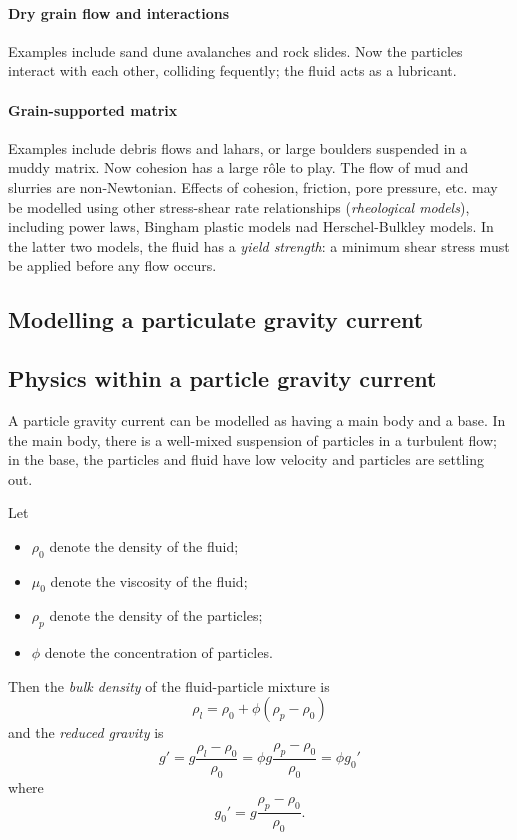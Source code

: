 \paragraph{Dry grain flow and interactions} Examples include sand dune
avalanches and rock slides. Now the particles interact with each other,
colliding fequently; the fluid acts as a lubricant. 

\paragraph{Grain-supported matrix} Examples include debris flows and lahars, or
large boulders suspended in a muddy matrix. Now cohesion has a large r\^ole to
play. The flow of mud and slurries are non-Newtonian. Effects of cohesion,
friction, pore pressure, etc. may be modelled using other stress-shear rate
relationships (\textit{rheological models}), including power laws, Bingham
plastic models nad Herschel-Bulkley models. In the latter two models, the fluid
has a \textit{yield strength}: a minimum shear stress must be applied before any
flow occurs. 

\subsection{Modelling a particulate gravity current}



\subsection{Physics within a particle gravity current}

A particle gravity current can be modelled as having a main body and a base. In
the main body, there is a well-mixed suspension of particles in a turbulent
flow; in the base, the particles and fluid have low velocity and particles are
settling out. 

Let
\begin{itemize}
 \item $\rho_0$ denote the density of the fluid;
 \item $\mu_0$ denote the viscosity of the fluid;
 \item $\rho_p$ denote the density of the particles;
 \item $\phi$ denote the concentration of particles.
\end{itemize}
Then the \textit{bulk density} of the fluid-particle mixture is
\begin{equation}
    \rho_l = \rho_0 + \phi (\rho_p - \rho_0) 
\end{equation}
and the \textit{reduced gravity} is
\begin{equation}
 g' = g \frac{\rho_l - \rho_0}{\rho_0} = \phi g \frac{\rho_p - \rho_0}{\rho_0} = \phi g_0'
\end{equation}
where
\begin{equation}
    g_0' = g \frac{\rho_p - \rho_0}{\rho_0}.
\end{equation}

